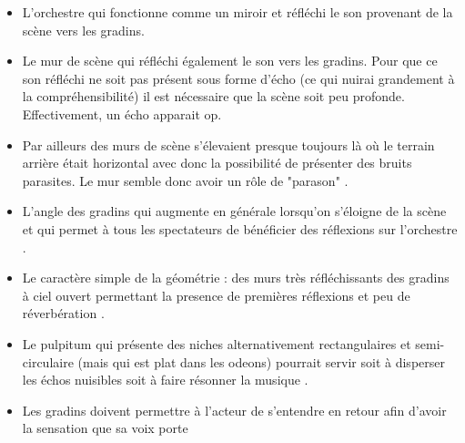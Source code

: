\begin{itemize}
\item L'orchestre qui fonctionne comme un miroir et réfléchi le son provenant de la scène vers les gradins.
\item Le mur de scène qui réfléchi également le son vers les gradins. Pour que ce son réfléchi ne soit pas présent sous forme d'écho (ce qui nuirai grandement à la compréhensibilité) il est nécessaire que la scène soit peu profonde. Effectivement, un écho apparait op. 
\item Par ailleurs des murs de scène s'élevaient presque toujours là où le terrain arrière était horizontal avec donc la possibilité de présenter des bruits parasites. Le mur semble donc avoir un rôle de "parason" \cite[p.38]{canac}.
\item L'angle des gradins qui augmente en générale lorsqu'on s'éloigne de la scène et qui permet à tous les spectateurs de bénéficier des réflexions sur l'orchestre \cite[p.103-109]{canac}.
\item Le caractère simple de la géométrie : des murs très réfléchissants des gradins à ciel ouvert permettant la presence de premières réflexions et peu de réverbération \cite[p.33]{canac}.
\item Le \gls{pulpitum} qui présente des niches alternativement rectangulaires et semi-circulaire (mais qui est plat dans les \glspl{odeon}) pourrait servir soit à disperser les échos nuisibles soit à faire résonner la musique \cite[p.38]{canac}.
\item Les gradins doivent permettre à l'acteur de s'entendre en retour afin d'avoir la sensation que sa voix porte \cite[p.42 - tab.II-4]{canac}
\end{itemize}
